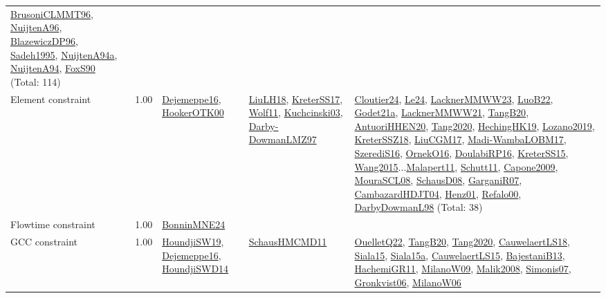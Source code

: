 {\begin{longtable}{p{3cm}r>{\raggedright\arraybackslash}p{6cm}>{\raggedright\arraybackslash}p{6cm}>{\raggedright\arraybackslash}p{8cm}}
\hyperref[detail:BrusoniCLMMT96]{BrusoniCLMMT96}, \hyperref[detail:NuijtenA96]{NuijtenA96}, \hyperref[detail:BlazewiczDP96]{BlazewiczDP96}, \hyperref[detail:Sadeh1995]{Sadeh1995}, \hyperref[detail:NuijtenA94a]{NuijtenA94a}, \hyperref[detail:NuijtenA94]{NuijtenA94}, \hyperref[detail:FoxS90]{FoxS90} (Total: 114)\\
\index{Element constraint}\index{Constraints!Element constraint}Element constraint &  1.00 & \hyperref[detail:Dejemeppe16]{Dejemeppe16}, \hyperref[detail:HookerOTK00]{HookerOTK00} & \hyperref[detail:LiuLH18]{LiuLH18}, \hyperref[detail:KreterSS17]{KreterSS17}, \hyperref[detail:Wolf11]{Wolf11}, \hyperref[detail:Kuchcinski03]{Kuchcinski03}, \hyperref[detail:Darby-DowmanLMZ97]{Darby-DowmanLMZ97} & \hyperref[detail:Cloutier24]{Cloutier24}, \hyperref[detail:Le24]{Le24}, \hyperref[detail:LacknerMMWW23]{LacknerMMWW23}, \hyperref[detail:LuoB22]{LuoB22}, \hyperref[detail:Godet21a]{Godet21a}, \hyperref[detail:LacknerMMWW21]{LacknerMMWW21}, \hyperref[detail:TangB20]{TangB20}, \hyperref[detail:AntuoriHHEN20]{AntuoriHHEN20}, \hyperref[detail:Tang2020]{Tang2020}, \hyperref[detail:HechingHK19]{HechingHK19}, \hyperref[detail:Lozano2019]{Lozano2019}, \hyperref[detail:KreterSSZ18]{KreterSSZ18}, \hyperref[detail:LiuCGM17]{LiuCGM17}, \hyperref[detail:Madi-WambaLOBM17]{Madi-WambaLOBM17}, \hyperref[detail:SzerediS16]{SzerediS16}, \hyperref[detail:OrnekO16]{OrnekO16}, \hyperref[detail:DoulabiRP16]{DoulabiRP16}, \hyperref[detail:KreterSS15]{KreterSS15}, \hyperref[detail:Wang2015]{Wang2015}...\hyperref[detail:Malapert11]{Malapert11}, \hyperref[detail:Schutt11]{Schutt11}, \hyperref[detail:Capone2009]{Capone2009}, \hyperref[detail:MouraSCL08]{MouraSCL08}, \hyperref[detail:SchausD08]{SchausD08}, \hyperref[detail:GarganiR07]{GarganiR07}, \hyperref[detail:CambazardHDJT04]{CambazardHDJT04}, \hyperref[detail:Henz01]{Henz01}, \hyperref[detail:Refalo00]{Refalo00}, \hyperref[detail:DarbyDowmanL98]{DarbyDowmanL98} (Total: 38)\\
\index{Flowtime constraint}\index{Constraints!Flowtime constraint}Flowtime constraint &  1.00 & \hyperref[detail:BonninMNE24]{BonninMNE24} &  & \\
\index{GCC constraint}\index{Constraints!GCC constraint}GCC constraint &  1.00 & \hyperref[detail:HoundjiSW19]{HoundjiSW19}, \hyperref[detail:Dejemeppe16]{Dejemeppe16}, \hyperref[detail:HoundjiSWD14]{HoundjiSWD14} & \hyperref[detail:SchausHMCMD11]{SchausHMCMD11} & \hyperref[detail:OuelletQ22]{OuelletQ22}, \hyperref[detail:TangB20]{TangB20}, \hyperref[detail:Tang2020]{Tang2020}, \hyperref[detail:CauwelaertLS18]{CauwelaertLS18}, \hyperref[detail:Siala15]{Siala15}, \hyperref[detail:Siala15a]{Siala15a}, \hyperref[detail:CauwelaertLS15]{CauwelaertLS15}, \hyperref[detail:BajestaniB13]{BajestaniB13}, \hyperref[detail:HachemiGR11]{HachemiGR11}, \hyperref[detail:MilanoW09]{MilanoW09}, \hyperref[detail:Malik2008]{Malik2008}, \hyperref[detail:Simonis07]{Simonis07}, \hyperref[detail:Gronkvist06]{Gronkvist06}, \hyperref[detail:MilanoW06]{MilanoW06}\\

\end{longtable}}

